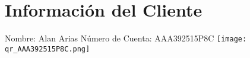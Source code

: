 \documentclass[a4paper]{article}
\begin{document}
\section*{Información del Cliente}
Nombre: Alan Arias
Número de Cuenta: AAA392515P8C
\vspace{1cm}
\texttt{[image: qr\_AAA392515P8C.png]}
\end{document}
